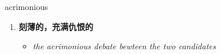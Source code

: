 
\begin{frame}
{\huge acrimonious}
\begin{center}
\begin{enumerate}\Large
  \item \textbf{刻薄的，充满仇恨的}
  \begin{itemize}
    \item \em{\Large{the acrimonious debate bewteen the two candidates}}
  \end{itemize}
\end{enumerate}
\end{center}
\end{frame}
